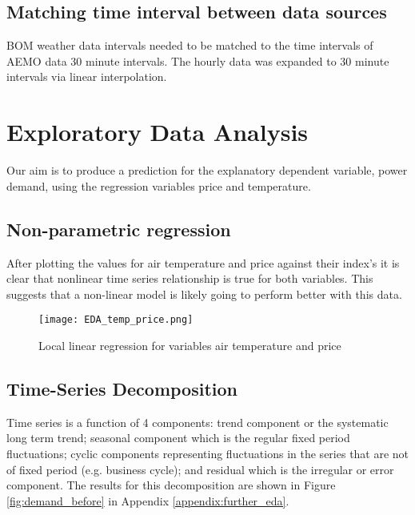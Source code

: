 \documentclass[11pt]{article}
\begin{document}
\subsection{Matching time interval between data sources} 
BOM weather data intervals needed to be matched to the time intervals of AEMO data 30 minute intervals. The hourly data was expanded to 30 minute intervals via linear interpolation.

\section{Exploratory Data Analysis}
Our aim is to produce a prediction for the explanatory dependent variable, power demand, using the regression variables price and temperature.
\subsection{Non-parametric regression}

After plotting the values for air temperature and price against their index's it is clear that nonlinear time series relationship is true for both variables. This suggests that a non-linear model is likely going to perform better with this data.

\begin{figure}[H]
\centering
\begin{minipage}{.6\textwidth}
  \centering
  \texttt{[image: EDA\_temp\_price.png]}
   \caption{Local linear regression for variables air temperature and price}
   \label{fig:EDA_temp_price}
\end{minipage}%
\end{figure}

\subsection{Time-Series Decomposition}
\label{section:time_series_decomposition}

Time series is a function of 4 components: trend component or the systematic long term trend; seasonal component which is the regular fixed period fluctuations; cyclic components representing fluctuations in the series that are not of fixed period (e.g. business cycle); and residual which is the irregular or error component. The results for this decomposition are shown in Figure \ref{fig:demand_before} in Appendix \ref{appendix:further_eda}. 
\\
\end{document}
